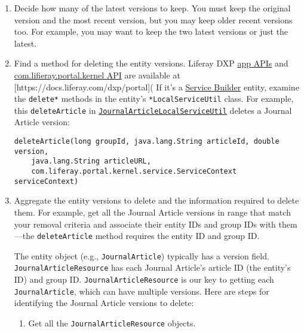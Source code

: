 \begin{enumerate}
\def\labelenumi{\arabic{enumi}.}
\item
  Decide how many of the latest versions to keep. You must keep the
  original version and the most recent version, but you may keep older
  recent versions too. For example, you may want to keep the two latest
  versions or just the latest.
\item
  Find a method for deleting the entity versions. Liferay DXP
  \href{https://docs.liferay.com/dxp/apps/apps/}{app APIs} and
  \href{https://docs.liferay.com/dxp/portal/7.2-latest/javadocs/portal-kernel/}{com.lifieray.portal.kernel
  API} are available at {[}https://docs.liferay.com/dxp/portal{]}( If
  it's a
  \href{/docs/7-2/appdev/-/knowledge_base/a/service-builder}{Service
  Builder} entity, examine the \texttt{delete*} methods in the entity's
  \texttt{*LocalServiceUtil} class. For example, this
  \texttt{deleteArticle} in
  \href{https://docs.liferay.com/dxp/apps/web-experience/latest/javadocs/com/liferay/journal/service/JournalArticleLocalServiceUtil.html\#deleteArticle-long-java.lang.String-double-java.lang.String-com.liferay.portal.kernel.service.ServiceContext-}{\texttt{JournalArticleLocalServiceUtil}}
  deletes a Journal Article version:

\begin{verbatim}
deleteArticle(long groupId, java.lang.String articleId, double version, 
    java.lang.String articleURL, 
    com.liferay.portal.kernel.service.ServiceContext serviceContext)
\end{verbatim}
\item
  Aggregate the entity versions to delete and the information required
  to delete them. For example, get all the Journal Article versions in
  range that match your removal criteria and associate their entity IDs
  and group IDs with them---the \texttt{deleteArticle} method requires
  the entity ID and group ID.

  The entity object (e.g., \texttt{JournalArticle}) typically has a
  version field. \texttt{JournalArticleResource} has each Journal
  Article's article ID (the entity's ID) and group ID.
  \texttt{JournalArticleResource} is our key to getting each
  \texttt{JournalArticle}, which can have multiple versions. Here are
  steps for identifying the Journal Article versions to delete:

  \begin{enumerate}
  \def\labelenumii{\arabic{enumii}.}
  \tightlist
  \item
    Get all the \texttt{JournalArticleResource} objects.
  \end{enumerate}


\end{enumerate}
